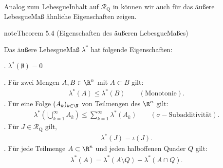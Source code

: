 \documentclass[letterpaper,10pt,english]{jupyterBook}
\begin{document}
\sphinxAtStartPar
Analog zum Lebesgue\sphinxhyphen{}Inhalt auf \(\mathcal{R}_\text{Q}\) in {\hyperref[\detokenize{masstheorie/masstheorie:thm:lebesguevolume}]{}} können wir auch für das äußere Lebesgue\sphinxhyphen{}Maß ähnliche Eigenschaften zeigen.
\label{masstheorie/masstheorie:thm:outerlebesgue}
\begin{sphinxadmonition}{note}{Theorem 5.4 (Eigenschaften des äußeren Lebesgue\sphinxhyphen{}Maßes)}



\sphinxAtStartPar
Das äußere Lebesgue\sphinxhyphen{}Maß \(\lambda^*\) hat folgende Eigenschaften:

. \(\lambda^*(\emptyset) = 0\)

. Für zwei Mengen \(A, B \in \R^n\) mit \(A \subset B\) gilt:
\begin{equation*}
\begin{split}\lambda^*(A) \leq \lambda^*(B) \qquad (\text{Monotonie}).\end{split}
\end{equation*}
. Für eine Folge \((A_k)_{k\in\N}\) von Teilmengen des \(\R^n\) gilt:
\begin{equation*}
\begin{split}\lambda^*\left( \bigcup_{k=1}^\infty A_k \right) \leq \sum_{k=1}^\infty \lambda^*(A_k) \qquad (\sigma\!-\!\text{Subadditivität}).\end{split}
\end{equation*}
. Für \(J\in\mathcal{R}_{\text{Q}}\) gilt,
\begin{equation*}
\begin{split}\lambda^*(J) = \iota(J).\end{split}
\end{equation*}
. Für jede Teilmenge \(A \subset \R^n\) und jeden halboffenen Quader \(Q\) gilt:
\begin{equation*}
\begin{split}\lambda^*(A) = \lambda^*(A \setminus Q) + \lambda^*(A \cap Q).\end{split}
\end{equation*}\end{sphinxadmonition}
\end{document}
